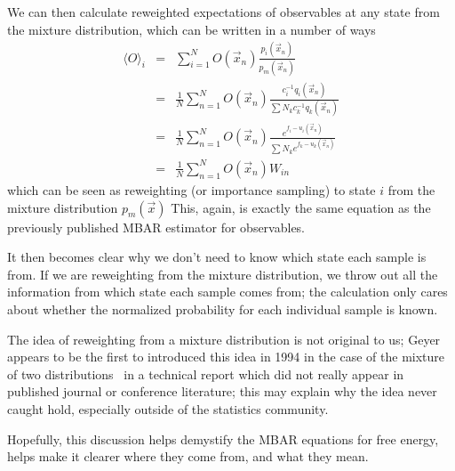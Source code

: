\documentclass[aps,pre,twocolumn,superscriptaddress]{revtex4-1}
\begin{document}
We can then calculate reweighted expectations of observables at any
state from the mixture distribution, which can be written in a number of ways
\begin{eqnarray}
\langle O \rangle_i  &=& \sum_{i=1}^N O(\vec{x}_n) \frac{p_i(\vec{x}_n)}{p_m(\vec{x}_n)} \nonumber \\
                     &=&  \frac{1}{N}\sum_{n=1}^N O(\vec{x}_n) \frac{c_i^{-1} q_i(\vec{x}_n)}{\sum N_k c_k^{-1} q_k(\vec{x}_n)} \nonumber \\ 
                     &=&  \frac{1}{N}\sum_{n=1}^N O(\vec{x}_n) \frac{e^{f_i-u_i(\vec{x}_n)}}{\sum N_k e^{f_k - u_k(\vec{x}_n)}} \nonumber \\ 
    &=& \frac{1}{N}\sum_{n=1}^N  O(\vec{x}_n) W_{in} 
\end{eqnarray}
which can be seen as reweighting (or importance sampling) to state $i$
from the mixture distribution $p_m(\vec{x})$ This, again, is exactly
the same equation as the previously published MBAR estimator for
observables.

It then becomes clear why we don't need to know which state each
sample is from. If we are reweighting from the mixture distribution,
we throw out all the information from which state each sample comes
from; the calculation only cares about whether the normalized
probability for each individual sample is known.

The idea of reweighting from a mixture distribution is not original to
us; Geyer appears to be the first to introduced this idea in 1994 in
the case of the mixture of two distributions~\citep{geyer:1994} in a
technical report which did not really appear in published journal or
conference literature; this may explain why the idea never caught
hold, especially outside of the statistics community.

Hopefully, this discussion helps demystify the MBAR equations for free
energy, helps make it clearer where they come from, and what they
mean.



\end{document}

